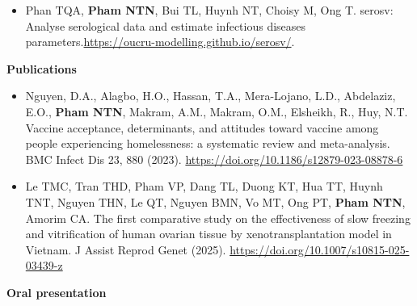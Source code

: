 \documentclass[
  16,
]{article}
\providecommand{\tightlist}{%
  \setlength{\itemsep}{0pt}\setlength{\parskip}{0pt}}\usepackage{longtable,booktabs,array}
\begin{document}
\vspace{-0.17cm}

\begin{itemize}
\tightlist
\item
  Phan TQA, \textbf{Pham NTN}, Bui TL, Huynh NT, Choisy M, Ong T.
  serosv: Analyse serological data and estimate infectious diseases
  parameters.\url{https://oucru-modelling.github.io/serosv/}.
\end{itemize}

\vspace{-0.16cm}

\begin{large}
\vspace{3pt}
\begin{multicols}{2}
\begin{flushleft}{\bf Publications}\end{flushleft}
\end{multicols}
\end{large}

\vspace{-0.17cm}

\begin{itemize}
\tightlist
\item
  Nguyen, D.A., Alagbo, H.O., Hassan, T.A., Mera-Lojano, L.D.,
  Abdelaziz, E.O., \textbf{Pham NTN}, Makram, A.M., Makram, O.M.,
  Elsheikh, R., Huy, N.T. Vaccine acceptance, determinants, and
  attitudes toward vaccine among people experiencing homelessness: a
  systematic review and meta-analysis. BMC Infect Dis 23, 880 (2023).
  \url{https://doi.org/10.1186/s12879-023-08878-6}
\end{itemize}

\vspace{-0.16cm}

\begin{itemize}
\tightlist
\item
  Le TMC, Tran THD, Pham VP, Dang TL, Duong KT, Hua TT, Huynh TNT,
  Nguyen THN, Le QT, Nguyen BMN, Vo MT, Ong PT, \textbf{Pham NTN},
  Amorim CA. The first comparative study on the effectiveness of slow
  freezing and vitrification of human ovarian tissue by
  xenotransplantation model in Vietnam. J Assist Reprod Genet (2025).
  \url{https://doi.org/10.1007/s10815-025-03439-z}
\end{itemize}

\vspace{-0.16cm}

\begin{large}
\vspace{3pt}
\begin{multicols}{2}
\begin{flushleft}{\bf Oral presentation}\end{flushleft}
\end{multicols}
\end{large}
\end{document}
